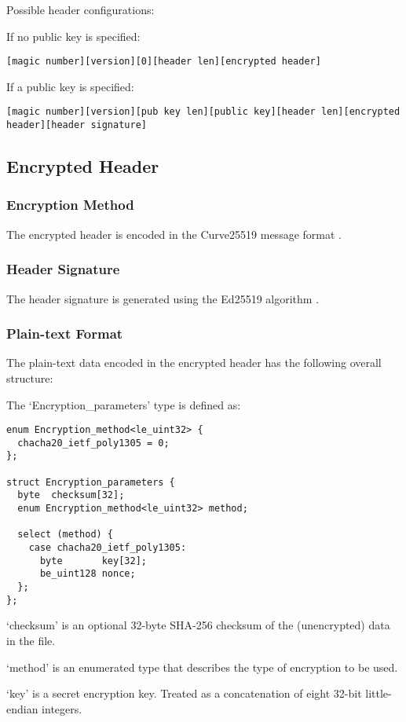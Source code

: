 \documentclass[10pt]{article}
\begin{document}
Possible header configurations:

If no public key is specified:
\begin{verbatim}
[magic number][version][0][header len][encrypted header]
\end{verbatim}

If a public key is specified:
\begin{verbatim}
[magic number][version][pub key len][public key][header len][encrypted header][header signature]
\end{verbatim}

\subsection{Encrypted Header}
\subsubsection{Encryption Method}
The encrypted header is encoded in the Curve25519 message format \cite{RFC7748}.

\subsubsection{Header Signature}
The header signature is generated using the Ed25519 algorithm \cite{RFC8032}.

\subsubsection{Plain-text Format}
The plain-text data encoded in the encrypted header has the following overall structure:

The `Encryption\_parameters' type is defined as:

\begin{verbatim}
enum Encryption_method<le_uint32> {
  chacha20_ietf_poly1305 = 0;
};

struct Encryption_parameters {
  byte	checksum[32];
  enum Encryption_method<le_uint32> method;

  select (method) {
    case chacha20_ietf_poly1305:
      byte       key[32];
      be_uint128 nonce;
  };
};
\end{verbatim}

`checksum' is an optional 32-byte SHA-256 checksum of the (unencrypted) data in the file.

`method' is an enumerated type that describes the type of encryption to be used.

`key' is a secret encryption key.
Treated as a concatenation of eight 32-bit little-endian integers.
\end{document}
